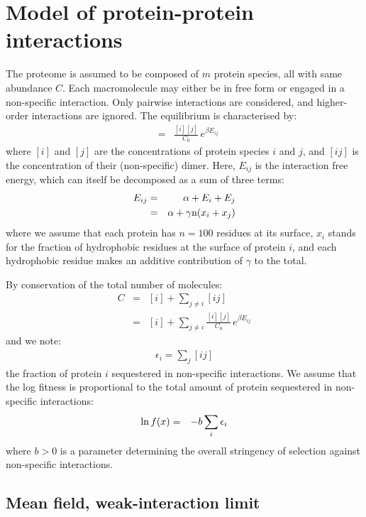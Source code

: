 \documentclass{article}
\begin{document}
\section{Model of protein-protein interactions}

The proteome is assumed to be composed of $m$ protein species, all with same abundance $C$. Each macromolecule may either be in free form or engaged in a non-specific interaction. Only pairwise interactions are considered, and higher-order interactions are ignored.
The equilibrium is characterised by:
\begin{eqnarray}
[ij] &=& \frac{[i][j]}{C_0} \, e^{\beta E_{ij}}
\end{eqnarray}
where $[i]$ and $[j]$ are the concentrations of protein species $i$ and $j$, and $[ij]$ is the concentration of their (non-specific) dimer. Here, $E_{ij}$ is the interaction free energy, which can itself be decomposed as a sum of three terms:
\begin{eqnarray}
E_{ij} &=& \alpha + E_i + E_j 
\\
&=& \alpha + \gamma \text{n} (x_i + x_j)
\end{eqnarray}
where we assume that each protein has $n=100$ residues at its surface, $x_i$ stands for the fraction of hydrophobic residues at the surface of protein $i$, and each hydrophobic residue makes an additive contribution of $\gamma$ to the total.


By conservation of the total number of molecules:
\begin{eqnarray}
C &=& [i] + \sum_{j \neq i} [ij] \\
&=& [i] + \sum_{j \neq i} \frac{[i][j]}{C_0} \, e^{\beta E_{ij}}
\end{eqnarray}
and we note:
\begin{eqnarray}
\epsilon_i = \sum_j [ij]
\end{eqnarray}
the fraction of protein $i$ sequestered in non-specific interactions.
We assume that the log fitness is proportional to the total amount of protein sequestered in non-specific interactions:
\begin{eqnarray}
\ln f(x) &=& -b \sum_i \epsilon_i
\end{eqnarray}
where $b>0$ is a parameter determining the overall stringency of selection against non-specific interactions.

\subsection{Mean field, weak-interaction limit}
\end{document}
